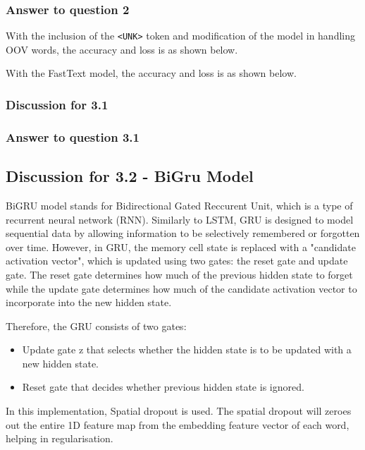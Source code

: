 \documentclass{article}
\newcommand{\code}[1]{\texttt{#1}}
\begin{document}
\subsubsection*{Answer to question 2}

With the inclusion of the \code{<UNK>} token and modification of the model
in handling OOV words, the accuracy and loss is as shown below.


With the FastText model, the accuracy and loss is as shown below.


\subsubsection*{Discussion for 3.1}

\subsubsection*{Answer to question 3.1}

\subsection*{Discussion for 3.2 - BiGru Model}
BiGRU model stands for Bidirectional Gated Reccurent Unit, which is a type of
recurrent neural network (RNN). Similarly to LSTM, GRU is designed to model
sequential data by allowing information to be selectively remembered or
forgotten over time. However, in GRU, the memory cell state is replaced with a
"candidate activation vector", which is updated using two gates: the reset gate
and update gate. The reset gate determines how much of the previous hidden
state to forget while the update gate determines how much of the candidate
activation vector to incorporate into the new hidden state.

Therefore, the GRU consists of two gates:
\begin{itemize}
    \item Update gate z that selects whether the hidden state is to be updated with a new
          hidden state.
    \item Reset gate that decides whether previous hidden state is ignored.
\end{itemize}

In this implementation, Spatial dropout is used. The spatial dropout will
zeroes out the entire 1D feature map from the embedding feature vector of each
word, helping in regularisation.
\end{document}
